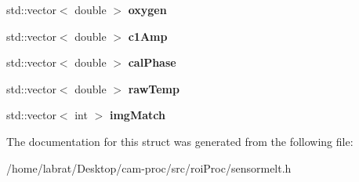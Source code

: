 \begin{DoxyCompactItemize}
\item 
std\+::vector$<$ double $>$ {\bfseries oxygen}\hypertarget{structSensorMelt_1_1SensorOptode_a921327fc78619c09aea8ee6d71909d40}{}\label{structSensorMelt_1_1SensorOptode_a921327fc78619c09aea8ee6d71909d40}

\item 
std\+::vector$<$ double $>$ {\bfseries c1\+Amp}\hypertarget{structSensorMelt_1_1SensorOptode_a8f1e0f1fba88acf64e23e9cc498816a4}{}\label{structSensorMelt_1_1SensorOptode_a8f1e0f1fba88acf64e23e9cc498816a4}

\item 
std\+::vector$<$ double $>$ {\bfseries cal\+Phase}\hypertarget{structSensorMelt_1_1SensorOptode_a8edb065391c1b0d71018037a22f9fa9d}{}\label{structSensorMelt_1_1SensorOptode_a8edb065391c1b0d71018037a22f9fa9d}

\item 
std\+::vector$<$ double $>$ {\bfseries raw\+Temp}\hypertarget{structSensorMelt_1_1SensorOptode_a5690573ad3964f88a970d700aa1d9c8b}{}\label{structSensorMelt_1_1SensorOptode_a5690573ad3964f88a970d700aa1d9c8b}

\item 
std\+::vector$<$ int $>$ {\bfseries img\+Match}\hypertarget{structSensorMelt_1_1SensorOptode_a20a79538d92f02ca9b7f647a781ed352}{}\label{structSensorMelt_1_1SensorOptode_a20a79538d92f02ca9b7f647a781ed352}

\end{DoxyCompactItemize}


The documentation for this struct was generated from the following file\+:\begin{DoxyCompactItemize}
\item 
/home/labrat/\+Desktop/cam-\/proc/src/roi\+Proc/sensormelt.\+h\end{DoxyCompactItemize}
